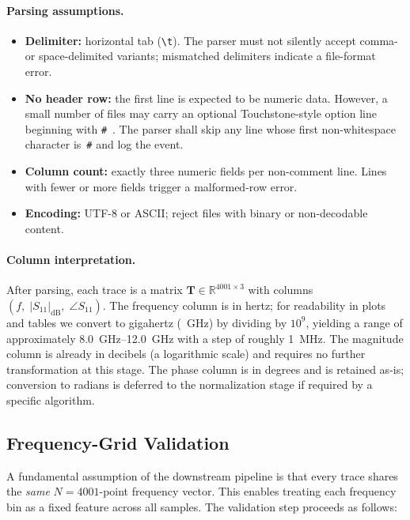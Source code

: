 \paragraph{Parsing assumptions.}
\begin{itemize}
  \item \textbf{Delimiter:} horizontal tab (\verb|\t|).
        The parser must not silently accept comma- or space-delimited
        variants; mismatched delimiters indicate a file-format error.
  \item \textbf{No header row:} the first line is expected to be numeric
        data.  However, a small number of files may carry an optional
        Touchstone-style option line beginning with
        \texttt{\#}~\cite{touchstone_spec}.  The parser shall skip any
        line whose first non-whitespace character is~\texttt{\#} and log
        the event.
  \item \textbf{Column count:} exactly three numeric fields per
        non-comment line.  Lines with fewer or more fields trigger a
        malformed-row error.
  \item \textbf{Encoding:} UTF-8 or ASCII; reject files with binary or
        non-decodable content.
\end{itemize}

\paragraph{Column interpretation.}
After parsing, each trace is a matrix
$\mathbf{T}\in\mathbb{R}^{4001\times 3}$ with columns
$(f,\;|S_{11}|_{\text{dB}},\;\angle S_{11})$.
The frequency column is in hertz; for readability in plots and tables we
convert to gigahertz (\SI{}{\giga\hertz}) by dividing by $10^{9}$,
yielding a range of approximately \SIrange{8.0}{12.0}{\giga\hertz} with
a step of roughly \SI{1}{\mega\hertz}.
The magnitude column is already in decibels (a logarithmic scale) and
requires no further transformation at this stage.
The phase column is in degrees and is retained as-is; conversion to
radians is deferred to the normalization stage if required by a specific
algorithm.

\subsection{Frequency-Grid Validation}
\label{sec:preproc:freqgrid}

A fundamental assumption of the downstream pipeline is that every trace
shares the \emph{same} $N=4001$-point frequency vector.  This enables
treating each frequency bin as a fixed feature across all samples.  The
validation step proceeds as follows:

